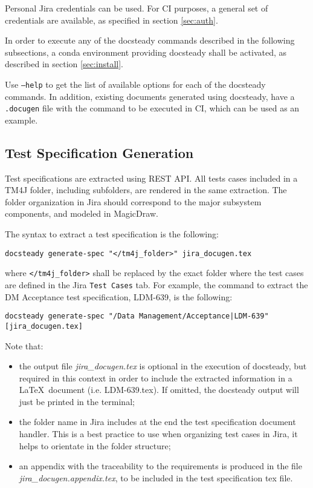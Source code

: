 \documentclass[DM]{lsstdoc}
\begin{document}
Personal Jira credentials can be used. 
For CI purposes, a general set of credentials are available, as specified in section \ref{sec:auth}.

In order to execute any of the docsteady commands described in the following subsections, a conda environment providing docsteady shall be activated, as described in section \ref{sec:install}.

Use \texttt{--help} to get the list of available options for each of the docsteady commands.
In addition, existing documents generated using docsteady, have a \texttt{.docugen} file with the command to be executed in CI, which can be used as an example.



\subsection{Test Specification Generation}

Test specifications are extracted using REST API.
All tests cases included in a TM4J folder, including subfolders, are rendered in the same extraction.
The folder organization in Jira should correspond to the major subsystem components, and modeled in MagicDraw.

The syntax to extract a test specification is the following:

\texttt{docsteady generate-spec "</tm4j\_folder>" jira\_docugen.tex}

where \texttt{</tm4j\_folder>} shall be replaced by the exact folder where the test cases are defined in the Jira \texttt{Test Cases} tab.
For example, the command to extract the DM Acceptance test specification, LDM-639, is the following:

\texttt{docsteady generate-spec "/Data Management/Acceptance|LDM-639" [jira\_docugen.tex]}

Note that:
\begin{itemize}
\item the output file \textit{jira\_docugen.tex} is optional in the execution of docsteady, but required in this context in order to include the extracted information in a \LaTeX~document (i.e. LDM-639.tex). If omitted, the docsteady  output will just be printed in the terminal;
\item the folder name in Jira includes at the end the test specification document handler. This is a best practice to use when organizing test cases in Jira, it helps to orientate in the folder structure;
\item an appendix with the traceability to the requirements is produced in the file \textit{jira\_docugen.appendix.tex}, to be included in the test specification tex file. 
\end{itemize}
\end{document}
